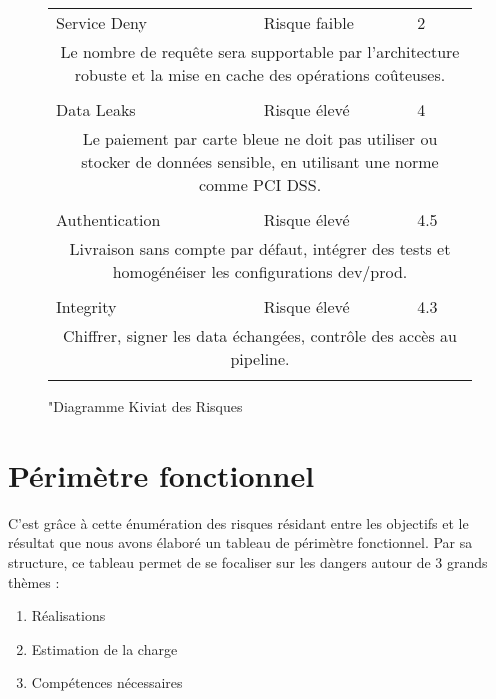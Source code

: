 \documentclass[12pt]{article}
\begin{document}
\begin{landscape}
\begin{figure}[!htb]
{\begin{minipage}{0.5\columnwidth}
\begin{table}[H]
\begin{center}
\begin{tabular}{p{4cm}p{3cm}p{.5cm}}
     \\
	Service Deny\cellcolor{blue!60}&Risque faible\cellcolor{violet!60}&2\cellcolor{red!60}\\
\multicolumn{3}{c}{\parbox{7.5cm}{Le nombre de requête sera supportable par l’architecture robuste et la mise en cache des opérations coûteuses.}}\\\\
	Data Leaks\cellcolor{red!60}&Risque élevé\cellcolor{violet!60}&4\cellcolor{red!60}\\
\multicolumn{3}{c}{\parbox{7.5cm}{Le paiement par carte bleue ne doit pas utiliser ou stocker de données sensible, en utilisant une norme comme PCI DSS.}}\\\\
	Authentication\cellcolor{red!60}&Risque élevé\cellcolor{violet!60}&4.5\cellcolor{red!60}\\
\multicolumn{3}{c}{\parbox{7.5cm}{Livraison sans compte par défaut, intégrer des tests et homogénéiser les configurations dev/prod.}}\\\\
	Integrity\cellcolor{red!60}&Risque élevé\cellcolor{violet!60}&4.3\cellcolor{red!60}\\
\multicolumn{3}{c}{\parbox{7.5cm}{Chiffrer, signer les data échangées, contrôle des accès au pipeline.}}\\\\
\end{tabular}
\end{center}
\label{tab:multicol}
\end{table}	
   \end{minipage}
}   
\caption{"Diagramme Kiviat des Risques}
\end{figure}

\end{landscape}
\newpage
\section{Périmètre fonctionnel}

C’est grâce à cette énumération des risques résidant entre les objectifs et le résultat que nous avons élaboré un tableau de périmètre fonctionnel.
Par sa structure, ce tableau permet de se focaliser sur les dangers autour de 3 grands thèmes :
\begin{enumerate}
	\item Réalisations
	\item Estimation de la charge
	\item Compétences nécessaires
\end{enumerate}
\end{document}
